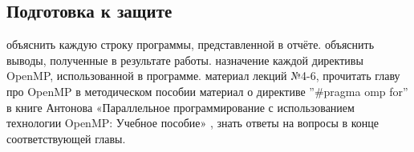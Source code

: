 \subsection{Подготовка к защите}
\begin{enumerate}
     объяснить каждую строку программы, представленной в отчёте.
     объяснить выводы, полученные в результате работы.
     назначение каждой директивы OpenMP, использованной в программе.
     материал лекций №4-6, прочитать главу про OpenMP в методическом пособии
     материал о директиве ''\#pragma omp for'' в книге Антонова «Параллельное программирование с использованием технологии OpenMP: Учебное пособие» \cite{AntonovOpenMP2004}, знать ответы на вопросы в конце соответствующей главы.
\end{enumerate}
